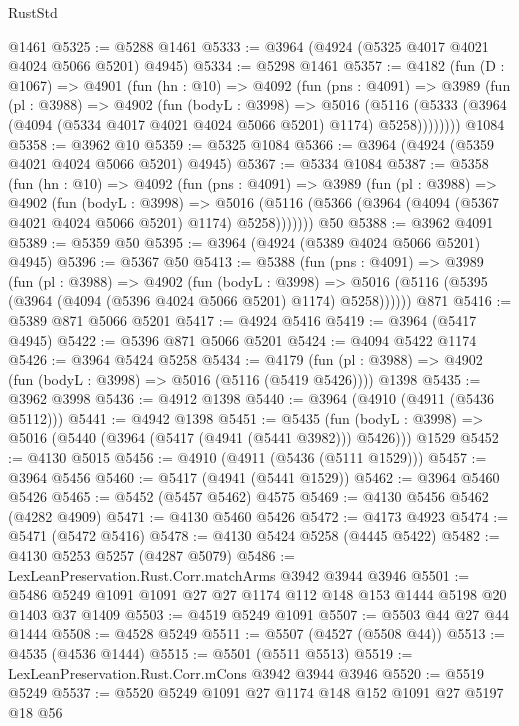 \begin{lexlean}{RustStd}
\begin{coremodule}
    @1461
@5325 := @5288 @1461
@5333 := @3964 (@4924 (@5325 @4017 @4021 @4024 @5066 @5201) @4945)
@5334 := @5298 @1461
@5357 := @4182
    (fun (D : @1067) =>
    @4901
      (fun (hn : @10) =>
      @4092
        (fun (pns : @4091) =>
        @3989
          (fun (pl : @3988) =>
          @4902
            (fun (bodyL : @3998) =>
            @5016
              (@5116 (@5333 (@3964 (@4094 (@5334 @4017 @4021 @4024 @5066 @5201) @1174) @5258))))))))
    @1084
@5358 := @3962 @10
@5359 := @5325 @1084
@5366 := @3964 (@4924 (@5359 @4021 @4024 @5066 @5201) @4945)
@5367 := @5334 @1084
@5387 := @5358
    (fun (hn : @10) =>
    @4092
      (fun (pns : @4091) =>
      @3989
        (fun (pl : @3988) =>
        @4902
          (fun (bodyL : @3998) =>
          @5016 (@5116 (@5366 (@3964 (@4094 (@5367 @4021 @4024 @5066 @5201) @1174) @5258)))))))
    @50
@5388 := @3962 @4091
@5389 := @5359 @50
@5395 := @3964 (@4924 (@5389 @4024 @5066 @5201) @4945)
@5396 := @5367 @50
@5413 := @5388
    (fun (pns : @4091) =>
    @3989
      (fun (pl : @3988) =>
      @4902
        (fun (bodyL : @3998) =>
        @5016 (@5116 (@5395 (@3964 (@4094 (@5396 @4024 @5066 @5201) @1174) @5258))))))
    @871
@5416 := @5389 @871 @5066 @5201
@5417 := @4924 @5416
@5419 := @3964 (@5417 @4945)
@5422 := @5396 @871 @5066 @5201
@5424 := @4094 @5422 @1174
@5426 := @3964 @5424 @5258
@5434 := @4179
    (fun (pl : @3988) => @4902 (fun (bodyL : @3998) => @5016 (@5116 (@5419 @5426))))
    @1398
@5435 := @3962 @3998
@5436 := @4912 @1398
@5440 := @3964 (@4910 (@4911 (@5436 @5112)))
@5441 := @4942 @1398
@5451 := @5435
    (fun (bodyL : @3998) => @5016 (@5440 (@3964 (@5417 (@4941 (@5441 @3982))) @5426)))
    @1529
@5452 := @4130 @5015
@5456 := @4910 (@4911 (@5436 (@5111 @1529)))
@5457 := @3964 @5456
@5460 := @5417 (@4941 (@5441 @1529))
@5462 := @3964 @5460 @5426
@5465 := @5452 (@5457 @5462) @4575
@5469 := @4130 @5456 @5462 (@4282 @4909)
@5471 := @4130 @5460 @5426
@5472 := @4173 @4923
@5474 := @5471 (@5472 @5416)
@5478 := @4130 @5424 @5258 (@4445 @5422)
@5482 := @4130 @5253 @5257 (@4287 @5079)
@5486 := LexLeanPreservation.Rust.Corr.matchArms @3942 @3944 @3946
@5501 := @5486 @5249 @1091 @1091 @27 @27 @1174 @112 @148 @153 @1444 @5198 @20 @1403 @37 @1409
@5503 := @4519 @5249 @1091
@5507 := @5503 @44 @27 @44 @1444
@5508 := @4528 @5249
@5511 := @5507 (@4527 (@5508 @44))
@5513 := @4535 (@4536 @1444)
@5515 := @5501 (@5511 @5513)
@5519 := LexLeanPreservation.Rust.Corr.mCons @3942 @3944 @3946
@5520 := @5519 @5249
@5537 := @5520
    @5249
    @1091
    @27
    @1174
    @148
    @152
    @1091
    @27
    @5197
    @18
    @56

\end{coremodule}
\end{lexlean}
